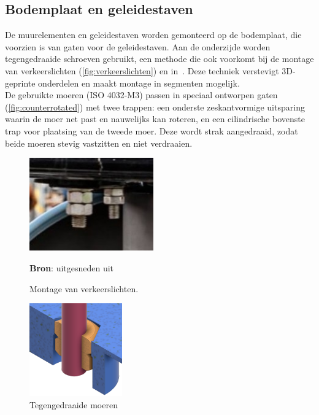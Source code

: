 \subsection{Bodemplaat en geleidestaven}
De muurelementen en geleidestaven worden gemonteerd op de bodemplaat, die voorzien is van gaten voor de geleidestaven. Aan de onderzijde worden tegengedraaide schroeven gebruikt, een methode die ook voorkomt bij de montage van verkeerslichten (\autoref{fig:verkeerslichten}) en in\ \cite{RN40}. Deze techniek verstevigt 3D-geprinte onderdelen en maakt montage in segmenten mogelijk.
\\[12pt]De gebruikte moeren (ISO 4032-M3) passen in speciaal ontworpen gaten (\autoref{fig:counterrotated}) met twee trappen: een onderste zeskantvormige uitsparing waarin de moer net past en nauwelijks kan roteren, en een cilindrische bovenste trap voor plaatsing van de tweede moer. Deze wordt strak aangedraaid, zodat beide moeren stevig vastzitten en niet verdraaien.
\\[12pt]\begin{minipage}[t]{0.49\textwidth}
    \vspace{0pt}
    \begin{figure}[H]
        \centering
        \includegraphics[height=4cm]{figures/verkeerssituaties48.jpg}
        \caption{Montage van verkeerslichten.}\label{fig:verkeerslichten}
        \textbf{Bron}: uitgesneden uit\ \cite{RN39}
    \end{figure}
\end{minipage}
\begin{minipage}[t]{0.49\textwidth}
    \begin{figure}[H]
        \centering
        \includegraphics[height=4cm]{figures/InterlockingScrews.png}
        \caption{Tegengedraaide moeren}\label{fig:counterrotated}
    \end{figure}
\end{minipage}\\[12pt]
